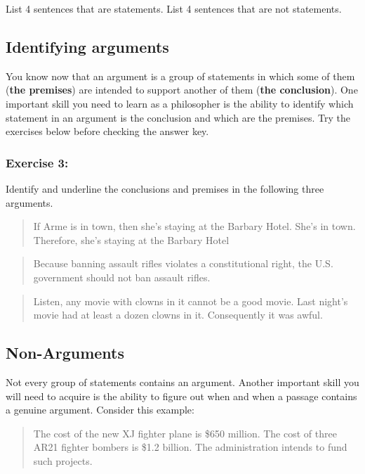 \documentclass[]{article}
\begin{document}
List 4 sentences that are statements. List 4 sentences that are not
statements.

\subsection{Identifying arguments}\label{identifying-arguments}

You know now that an argument is a group of statements in which some of
them (\textbf{the premises}) are intended to support another of them
(\textbf{the conclusion}). One important skill you need to learn as a
philosopher is the ability to identify which statement in an argument is
the conclusion and which are the premises. Try the exercises below
before checking the answer key.

\subsubsection{Exercise 3:}\label{exercise-3}

Identify and underline the conclusions and premises in the following
three arguments.

\begin{quote}
If Arme is in town, then she's staying at the Barbary Hotel. She's in
town. Therefore, she's staying at the Barbary Hotel
\end{quote}

\begin{quote}
Because banning assault rifles violates a constitutional right, the U.S.
government should not ban assault rifles.
\end{quote}

\begin{quote}
Listen, any movie with clowns in it cannot be a good movie. Last night's
movie had at least a dozen clowns in it. Consequently it was awful.
\end{quote}

\subsection{Non-Arguments}\label{non-arguments}

Not every group of statements contains an argument. Another important
skill you will need to acquire is the ability to figure out when and
when a passage contains a genuine argument. Consider this example:

\begin{quote}
The cost of the new XJ fighter plane is \$650 million. The cost of three
AR21 fighter bombers is \$1.2 billion. The administration intends to
fund such projects.
\end{quote}
\end{document}
